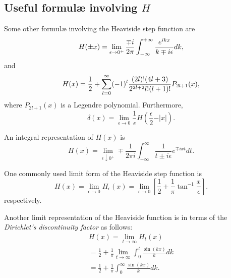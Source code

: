 \subsection{Useful formul\ae{} involving $H$}

Some other formul\ae{}  involving the Heaviside step function
are
 \begin{equation}
H (\pm x)=\lim_{\epsilon \rightarrow 0^+}{\mp i\over 2\pi
 }\int_{-\infty}^{+\infty} {e^{ikx}\over k\mp i\epsilon}dk,
 \end{equation}
and
 \begin{equation}
H (x)
={1\over 2}
+
\sum_{l=0}^\infty (-1)^l {(2l)!(4l+3)\over 2^{2l+2}l!(l+1)!}
P_{2l+1} (x),
 \end{equation}
where $P_{2l+1} (x)$ is a Legendre polynomial.
Furthermore,
\begin{equation}
\delta(x)=
\lim_{\epsilon \rightarrow 0}  \frac{1}{\epsilon } H\left( \frac{\epsilon }{2} -\vert x\vert\right) .
\end{equation}

An integral representation of $H(x)$ is
 \begin{equation}
H (x)
=\lim_{\epsilon \downarrow 0^+} \mp \frac{1}{2\pi i}
\int_{-\infty}^\infty
 \frac{1}{t \pm i\epsilon}e^{\mp ixt} dt.
 \end{equation}


One commonly used limit form  of the Heaviside step function is
\begin{equation}
H(x)= \lim_{\epsilon \rightarrow 0} H_\epsilon (x)=\lim_{\epsilon \rightarrow 0}   \left[ \frac{1 }{2} + \frac{1 }{\pi} \tan^{-1}  \frac{x}{\epsilon } \right] .
\end{equation}
respectively.

Another limit representation of the Heaviside function is in terms of the
{\em Dirichlet's discontinuity factor} as follows:
\begin{equation}
\begin{split}
H(x)= \lim_{t \rightarrow \infty} H_t (x)
\\
= \frac{1}{2}+\frac{1}{\pi }\lim_{t \rightarrow \infty}\int_0^t \frac{\sin (kx)}{k} dk
\\
=
\frac{1}{2}+\frac{1}{\pi }\int_0^\infty \frac{\sin (kx)}{k} dk
.
\end{split}
\label{2012-m-ch-di-dcf}
\end{equation}

